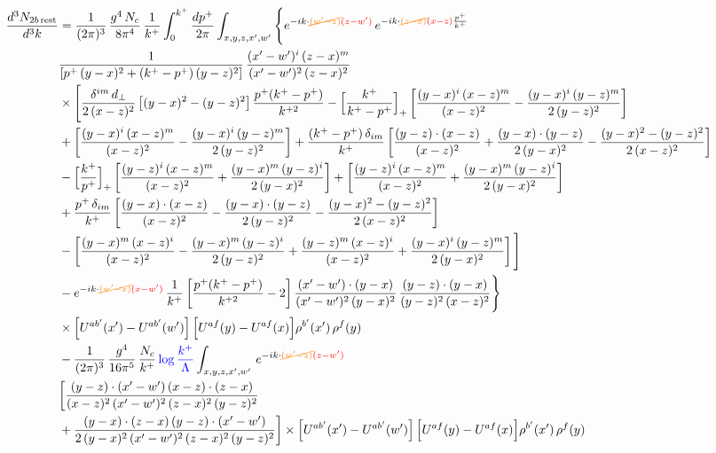 \documentclass[9pt]{article}
\numberwithin{equation}{section}
\begin{document}
\begin{align}
\frac{d^{3}N_{2b\,\rm rest}}{d^{3}k} & =\frac{1}{(2\pi)^{3}}\,\frac{g^{4}\,N_{c}}{8\pi^{4}}\,\frac{1}{k^{+}}\int_{0}^{k^{+}}\frac{dp^{+}}{2\pi}\int_{x,y,z,x',w'}\Bigg\{e^{-ik\cdot{\color{orange}\cancel{(w'-z)}}{\color{red}(z-w')}}\,e^{-ik\cdot{\color{orange}\cancel{(z-x)}}{\color{red}(x-z)}\frac{p^{+}}{k^{+}}}\,\notag \\ & \frac{1}{\left[p^{+}\,(y-x)^{2}+(k^{+}-p^{+})\,(y-z)^{2}\right]}\,\frac{(x'-w')^{i}\,(z-x)^{m}}{(x'-w')^{2}\,(z-x)^{2}}\notag\\
&\times\Bigg[\frac{\delta^{im}\,d_{\perp}}{2\,(x-z)^{2}}\left[(y-x)^{2}-(y-z)^{2}\right]\frac{p^{+}(k^{+}-p^{+})}{k^{+2}}
-\Big[\frac{k^{+}}{k^{+}-p^{+}}\Big]_{+}\left[\frac{(y-x)^{i}\,(x-z)^{m}}{(x-z)^{2}}-\frac{(y-x)^{i}\,(y-z)^{m}}{2\,(y-z)^{2}}\right]\notag\\
&+\left[\frac{(y-x)^{i}\,(x-z)^{m}}{(x-z)^{2}}-\frac{(y-x)^{i}\,(y-z)^{m}}{2\,(y-z)^{2}}\right]
+\frac{(k^{+}-p^{+})\,\delta_{im}}{k^{+}}\left[\frac{(y-z)\cdot(x-z)}{(x-z)^{2}}+\frac{(y-x)\cdot(y-z)}{2\,(y-x)^{2}}-\frac{(y-x)^{2}-(y-z)^{2}}{2\,(x-z)^{2}}\right]\notag\\
&-\Big[\frac{k^{+}}{p^{+}}\Big]_{+}\left[\frac{(y-z)^{i}\,(x-z)^{m}}{(x-z)^{2}}+\frac{(y-x)^{m}\,(y-z)^{i}}{2\,(y-x)^{2}}\right]+\left[\frac{(y-z)^{i}\,(x-z)^{m}}{(x-z)^{2}}+\frac{(y-x)^{m}\,(y-z)^{i}}{2\,(y-x)^{2}}\right]\notag\\
&+\frac{p^{+}\,\delta_{im}}{k^{+}}\left[\frac{(y-x)\cdot(x-z)}{(x-z)^{2}}-\frac{(y-x)\cdot(y-z)}{2\,(y-z)^{2}}-\frac{(y-x)^{2}-(y-z)^{2}}{2\,(x-z)^{2}}\right]\notag\\
&-\left[\frac{(y-x)^{m}\,(x-z)^{i}}{(x-z)^{2}}-\frac{(y-x)^{m}\,(y-z)^{i}}{2\,(y-z)^{2}}+\frac{(y-z)^{m}\,(x-z)^{i}}{(x-z)^{2}}+\frac{(y-x)^{i}\,(y-z)^{m}}{2\,(y-x)^{2}}\right]\Bigg]\notag\\
&-e^{-ik\cdot{\color{orange}\cancel{(w'-x)}}{\color{red}(x-w')}}\,\frac{1}{k^{+}}\left[\frac{p^{+}(k^{+}-p^{+})}{k^{+2}}-2\right]\frac{(x'-w')\cdot(y-x)}{(x'-w')^{2}\,(y-x)^{2}}\,\frac{(y-z)\cdot(y-x)}{(y-z)^{2}\,(x-z)^{2}}\Bigg\}\notag\\
&\times\Big[U^{ab'}(x')-U^{ab'}(w')\Big]\,\Big[U^{af}(y)-U^{af}(x)\Big]\rho^{b'}(x')\,\rho^{f}(y)\notag \\ & -\frac{1}{(2\pi)^{3}}\,\frac{g^{4}}{16\pi^{5}}\,\frac{N_{c}}{k^{+}}\,{\color{blue}\log\frac{k^{+}}{\Lambda}}\int_{x,y,z,x',w'}\,e^{-ik\cdot{\color{orange}\cancel{(w'-z)}}{\color{red}(z-w')}}\,\notag \\ & \bigg[\frac{(y-z)\cdot (x'-w')\,(x-z)\cdot (z-x)}{(x-z)^{2}\,(x'-w')^{2}\,(z-x)^{2}\,(y-z)^{2}}\notag \\ & +\frac{(y-x)\cdot (z-x)\,(y-z)\cdot (x'-w')}{2\,(y-x)^{2}\,(x'-w')^{2}\,(z-x)^{2}\,(y-z)^{2}}\bigg]\times\Big[U^{ab'}(x')-U^{ab'}(w')\Big]\,\Big[U^{af}(y)-U^{af}(x)\Big]\rho^{b'}(x')\,\rho^{f}(y)\notag\\

\end{align}
\end{document}
